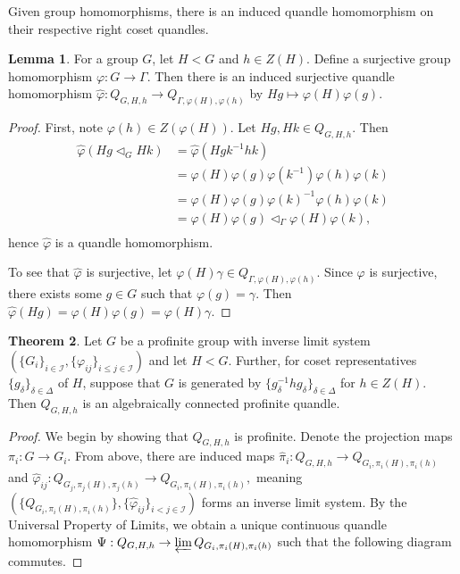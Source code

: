 \documentclass[reqno,dvipsnames]{amsart}
\theoremstyle{definition}
\newtheorem{theorem}{Theorem}[section]
\newtheorem{lemma}[theorem]{Lemma}
\begin{document}
{Given group homomorphisms, there is an induced quandle homomorphism on their respective right coset quandles.

\begin{lemma}
    For a group $G$, let $H < G$ and $h \in Z(H)$. Define a surjective group homomorphism $\varphi: G \to \Gamma.$ Then there is an induced surjective quandle homomorphism $\hat\varphi: Q_{G,H,h} \to Q_{\Gamma, \varphi(H),\varphi(h)}$ by $Hg \mapsto \varphi(H)\varphi(g)$.
\end{lemma}

\begin{proof}
First, note $\varphi(h) \in Z(\varphi(H)).$ Let $Hg,Hk \in Q_{G,H,h}.$ Then 
\begin{align*}
    \hat\varphi(Hg \triangleleft_G Hk) &= \hat\varphi(Hgk^{-1}hk)  \\
    &= \varphi(H)\varphi(g)\varphi(k^{-1})\varphi(h)\varphi(k) \\
    &= \varphi(H)\varphi(g)\varphi(k)^{-1}\varphi(h)\varphi(k) \\
    &= \varphi(H)\varphi(g) \triangleleft_\Gamma \varphi(H)\varphi(k), \\
\end{align*}
hence $\hat\varphi$ is a quandle homomorphism. 

To see that $\hat\varphi$ is surjective, let $\varphi(H)\gamma \in Q_{\Gamma,\varphi(H),\varphi(h)}.$ Since $\varphi$ is surjective, there exists some $g \in G$ such that $\varphi(g) = \gamma.$ Then $\hat\varphi(Hg) = \varphi(H)\varphi(g) = \varphi(H)\gamma.$

\end{proof}

\begin{theorem}
Let $G$ be a profinite group with inverse limit system $(\{G_i\}_{i \in \mathcal{I}},\{\varphi_{ij}\}_{i \leq j \in \mathcal{I}})$ and let $H < G$. Further, for coset representatives $\{g_\delta\}_{\delta \in \Delta}$ of $H$, suppose that $G$ is generated by $\{g_\delta^{-1}hg_\delta\}_{\delta \in \Delta}$ for $ h \in Z(H).$ Then $Q_{G,H,h}$ is an algebraically connected profinite quandle.
\end{theorem}

\begin{proof}
We begin by showing that $Q_{G,H,h}$ is profinite. Denote the projection maps $\pi_i : G \to G_i.$ From above, there are induced maps $\hat\pi_i : Q_{G,H,h} \to Q_{G_i, \pi_i(H),\pi_i(h)}$ and $\hat\varphi_{ij}: Q_{G_j, \pi_j(H),\pi_j(h)} \to Q_{G_i, \pi_i(H),\pi_i(h)},$ meaning $(\{Q_{G_i, \pi_i(H),\pi_i(h)}\},\{\hat\varphi_{ij}\}_{i<j \in \mathcal{I}})$ forms an inverse limit system. By the Universal Property of Limits, we obtain a unique continuous quandle homomorphism $\Psi: Q_{G,H,h} \to \varprojlim Q_{G_i, \pi_i(H),\pi_i(h)}$ such that the following diagram commutes.


\end{proof}}
\end{document}
